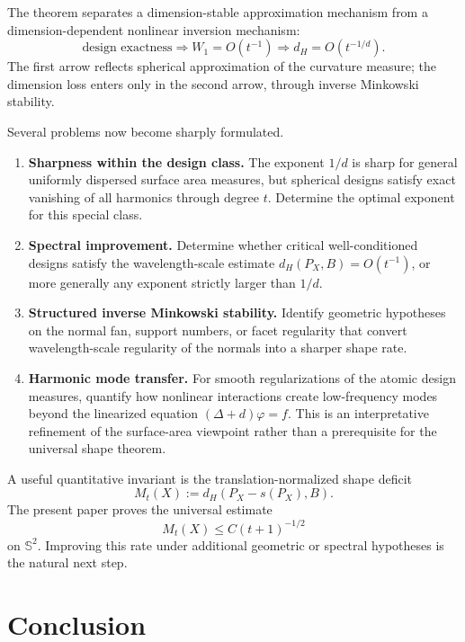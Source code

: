 \documentclass[11pt]{article}
\theoremstyle{definition}
\theoremstyle{remark}
\newcommand{\Sph}{\mathbb S}
\begin{document}
The theorem separates a dimension-stable approximation mechanism from a dimension-dependent nonlinear inversion mechanism:
\[
\boxed{
\text{design exactness}
\Longrightarrow
W_1=O(t^{-1})
\Longrightarrow
 d_H=O(t^{-1/d}).}
\]
The first arrow reflects spherical approximation of the curvature measure; the dimension loss enters only in the second arrow, through inverse Minkowski stability.

Several problems now become sharply formulated.
\begin{enumerate}[label=(\roman*)]
\item \textbf{Sharpness within the design class.} The exponent $1/d$ is sharp for general uniformly dispersed surface area measures, but spherical designs satisfy exact vanishing of all harmonics through degree $t$. Determine the optimal exponent for this special class.
\item \textbf{Spectral improvement.} Determine whether critical well-conditioned designs satisfy the wavelength-scale estimate $d_H(P_X,B)=O(t^{-1})$, or more generally any exponent strictly larger than $1/d$.
\item \textbf{Structured inverse Minkowski stability.} Identify geometric hypotheses on the normal fan, support numbers, or facet regularity that convert wavelength-scale regularity of the normals into a sharper shape rate.
\item \textbf{Harmonic mode transfer.} For smooth regularizations of the atomic design measures, quantify how nonlinear interactions create low-frequency modes beyond the linearized equation $(\Delta+d)\varphi=f$. This is an interpretative refinement of the surface-area viewpoint rather than a prerequisite for the universal shape theorem.
\end{enumerate}

A useful quantitative invariant is the translation-normalized shape deficit
\begin{equation}\label{eq:shape-deficit}
M_t(X):=d_H(P_X-s(P_X),B).
\end{equation}
The present paper proves the universal estimate
\begin{equation}\label{eq:shape-deficit-bound}
M_t(X)\le C(t+1)^{-1/2}
\end{equation}
on $\Sph^2$. Improving this rate under additional geometric or spectral hypotheses is the natural next step.

\section{Conclusion}
\end{document}

